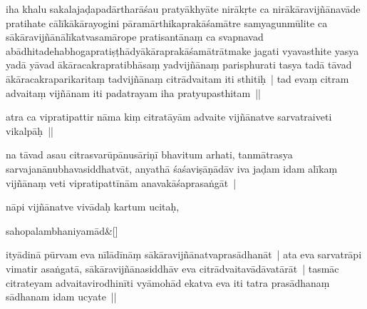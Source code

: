 \documentclass[article,12pt,a4paper]{memoir}%
\newcounter{parCount}
\begin{document}
	  
	  \pstart \leavevmode%
	\label{thakur75-129.7}iha khalu sakalajaḍapadārtharāśau pratyākhyāte nirākṛte ca nirākāravijñānavāde pratihate cālīkākārayogini pāramārthikaprakāśamātre samyagunmūlite ca sākāravijñānālīkatvasamārope pratisantānaṃ ca svapnavad abādhitadehabhogapratiṣṭhādyākāraprakāśamātrātmake jagati vyavasthite yasya yadā yāvad ākāracakrapratibhāsaṃ yadvijñānaṃ parisphurati tasya tadā tāvad ākāracakraparikaritaṃ tadvijñānaṃ citrādvaitam iti sthitiḥ | tad evaṃ citram advaitaṃ vijñānam iti padatrayam iha pratyupasthitam || 
	{}
	\pend%
      

	  
	  \pstart \leavevmode%
	\label{thakur75-129.13}atra ca vipratipattir nāma kiṃ citratāyām advaite vijñānatve sarvatraiveti vikalpāḥ || 
	{}
	\pend%
      

	  
	  \pstart \leavevmode%
	\label{thakur75-129.14}na tāvad asau citrasvarūpānusāriṇī bhavitum arhati, tanmātrasya \label{ratnakīrtinibandhāvali__36r1PF7IMSTQ7OTJHL7VDAR91JN}sarvajanānu\label{ratnakīrtinibandhāvali__36r1PF7IMSRS80XSPP70EAGRVE0}bhavasiddhatvāt, anyathā śaśaviṣāṇādāv iva jaḍam idam alīkaṃ vijñānaṃ veti vipratipattīnām anavakāśaprasaṅgāt |
	{}
	\pend%
      

	  
	  \pstart \leavevmode%
	nāpi vijñānatve vivādaḥ kartum ucitaḥ,
	{}
	\pend%
      
	    
	    \stanza[\smallbreak]
	  sahopalambhaniyamād\&[\smallbreak]
	  
	  
	  

	  
	  \pstart \leavevmode%
	ityādinā pūrvam eva nīlādīnāṃ sākāravijñānatvaprasādhanāt | ata eva sarvatrāpi vimatir asaṅgatā, sākāravijñānasiddhāv eva citrādvaitavādāvatārāt | tasmāc citrateyam advaitavirodhinīti vyāmohād ekatva eva  iti tatra prasādhanaṃ sādhanam idam ucyate ||
	{}
	\pend%
      
\end{document}
